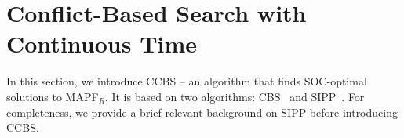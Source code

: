 \documentclass[review]{elsarticle}
\newcommand\konstantin[1]{\nb{\textbf{Konstantin:}}{red}{#1}}
\newcommand\roni[1]{\nb{\textbf{Roni:}}{green}{#1}}
\newcommand{\ccbs}{\ac{CCBS}\xspace}
\newcommand{\cbs}{\ac{CBS}\xspace}
\newcommand{\sipp}{\ac{SIPP}\xspace}
\newcommand{\mapfr}{\ac{MAPF}$_R$\xspace}
\begin{document}





\section{Conflict-Based Search with Continuous Time}

In this section, we introduce \ccbs{} -- an algorithm that finds SOC-optimal solutions to  \mapfr. 
It is based on two algorithms: \cbs~\cite{sharon2015conflict} and \sipp~\cite{phillips2011sipp}. 
For completeness, we provide a brief relevant background on \sipp before introducing \ccbs. 
\end{document}
